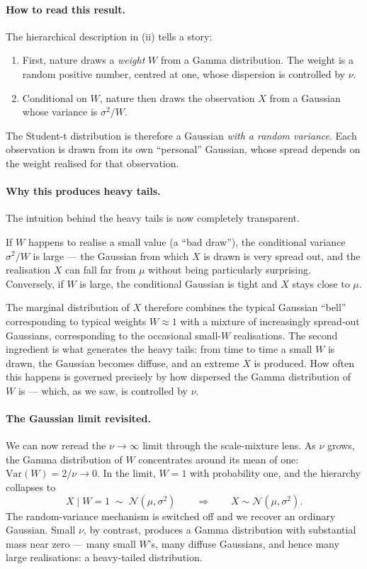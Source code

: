 \documentclass[11pt, a4paper, oneside]{article}
\begin{document}
\paragraph{How to read this result.}
The hierarchical description in (ii) tells a story:
\begin{enumerate}[leftmargin=1.5em, itemsep=2pt]
    \item First, nature draws a \emph{weight} $W$ from a Gamma distribution.
          The weight is a random positive number, centred at one, whose
          dispersion is controlled by $\nu$.
    \item Conditional on $W$, nature then draws the observation $X$ from
          a Gaussian whose variance is $\sigma^2 / W$.
\end{enumerate}
The Student-t distribution is therefore a Gaussian \emph{with a random
variance}. Each observation is drawn from its own ``personal'' Gaussian,
whose spread depends on the weight realised for that observation.

\paragraph{Why this produces heavy tails.}
The intuition behind the heavy tails is now completely transparent.

If $W$ happens to realise a small value (a ``bad draw''), the conditional
variance $\sigma^2/W$ is large — the Gaussian from which $X$ is drawn is
very spread out, and the realisation $X$ can fall far from $\mu$ without
being particularly surprising. Conversely, if $W$ is large, the conditional
Gaussian is tight and $X$ stays close to $\mu$.

The marginal distribution of $X$ therefore combines the typical Gaussian
``bell'' corresponding to typical weights $W \approx 1$ with a mixture of
increasingly spread-out Gaussians, corresponding to the occasional
small-$W$ realisations. The second ingredient is what generates the
heavy tails: from time to time a small $W$ is drawn, the Gaussian becomes
diffuse, and an extreme $X$ is produced. How often this happens is
governed precisely by how dispersed the Gamma distribution of $W$ is —
which, as we saw, is controlled by $\nu$.

\paragraph{The Gaussian limit revisited.}
We can now reread the $\nu \to \infty$ limit through the scale-mixture
lens. As $\nu$ grows, the Gamma distribution of $W$ concentrates around
its mean of one: $\mathrm{Var}(W) = 2/\nu \to 0$. In the limit, $W = 1$
with probability one, and the hierarchy collapses to
\[
X \mid W = 1 \;\sim\; \mathcal{N}(\mu, \sigma^{2}) \qquad \Longrightarrow \qquad X \sim \mathcal{N}(\mu, \sigma^{2}).
\]
The random-variance mechanism is switched off and we recover an ordinary
Gaussian. Small $\nu$, by contrast, produces a Gamma distribution with
substantial mass near zero — many small $W$'s, many diffuse Gaussians, and
hence many large realisations: a heavy-tailed distribution.
\end{document}
